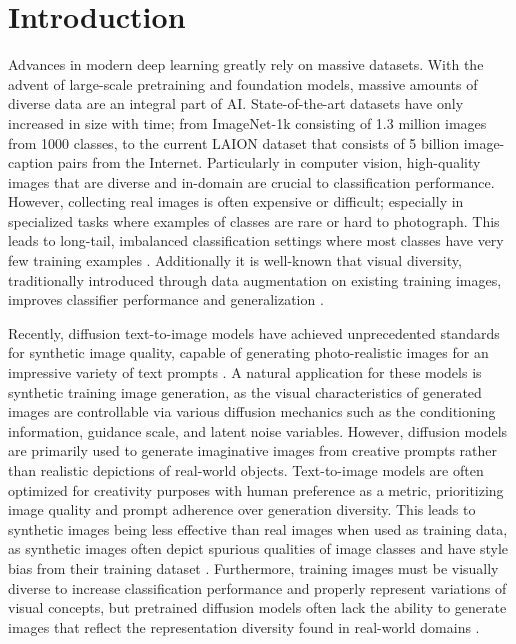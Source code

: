 \section{Introduction}
\vspace{-0.2cm}

Advances in modern deep learning greatly rely on massive datasets. 
With the advent of large-scale pretraining and foundation models, massive amounts of diverse data are an integral part of AI. 
State-of-the-art datasets have only increased in size with time; from ImageNet-1k \cite{imagenet} consisting of 1.3 million images from 1000 classes, to the current LAION dataset \cite{laion5b} that consists of 5 billion image-caption pairs from the Internet. Particularly in computer vision, high-quality images that are diverse and in-domain are crucial to classification performance. However, collecting real images is often expensive or difficult; especially in specialized tasks where examples of classes are rare or hard to photograph. This leads to long-tail, imbalanced classification settings where most classes have very few training examples \citep{imagenetLT, balanced_softmax, decouple-lt}. Additionally it is well-known that visual diversity, traditionally introduced through data augmentation on existing training images, improves classifier performance and generalization \citep{imagenet_classification, cutmix, mixup, rand_aug}. 

Recently, diffusion text-to-image models have achieved unprecedented standards for synthetic image quality, capable of generating photo-realistic images for an impressive variety of text prompts \citep{sdxl, dalle-2, imagen}. 
A natural application for these models is synthetic training image generation, as the visual characteristics of generated images are controllable via various diffusion mechanics such as the conditioning information, guidance scale, and latent noise variables. 
However, diffusion models are primarily used to generate imaginative images from creative prompts rather than realistic depictions of real-world objects.
Text-to-image models are often optimized for creativity purposes with human preference as a metric, prioritizing image quality and prompt adherence over generation diversity. This leads to synthetic images being less effective than real images when used as training data, as synthetic images often depict spurious qualities of image classes and have style bias from their training dataset \citep{is_synthetic_data, fake_it}. 
Furthermore, training images must be visually diverse to increase classification performance and properly represent variations of visual concepts, but pretrained diffusion models often lack the ability to generate images that reflect the representation diversity found in real-world domains \citep{diversify, da-fusion, stable_bias, bias_survey, hall2023dig}.

